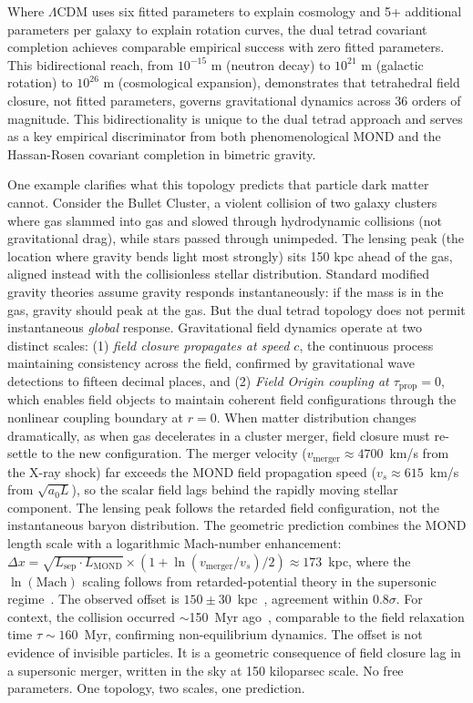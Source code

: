 \documentclass[aps,prd,preprint,superscriptaddress,showpacs,preprintnumbers,amsmath,amssymb,nofootinbib]{revtex4-2}
\begin{document}
Where $\Lambda$CDM uses six fitted parameters to explain cosmology and 5+ additional parameters per galaxy to explain rotation curves, the dual tetrad covariant completion achieves comparable empirical success with zero fitted parameters. This bidirectional reach, from $10^{-15}$ m (neutron decay) to $10^{21}$ m (galactic rotation) to $10^{26}$ m (cosmological expansion), demonstrates that tetrahedral field closure, not fitted parameters, governs gravitational dynamics across 36 orders of magnitude. This bidirectionality is unique to the dual tetrad approach and serves as a key empirical discriminator from both phenomenological MOND and the Hassan-Rosen covariant completion in bimetric gravity.

One example clarifies what this topology predicts that particle dark matter cannot. Consider the Bullet Cluster, a violent collision of two galaxy clusters where gas slammed into gas and slowed through hydrodynamic collisions (not gravitational drag), while stars passed through unimpeded. The lensing peak (the location where gravity bends light most strongly) sits 150 kpc ahead of the gas, aligned instead with the collisionless stellar distribution. Standard modified gravity theories assume gravity responds instantaneously: if the mass is in the gas, gravity should peak at the gas. But the dual tetrad topology does not permit instantaneous \emph{global} response. Gravitational field dynamics operate at two distinct scales: (1) \emph{field closure propagates at speed $c$}, the continuous process maintaining consistency across the field, confirmed by gravitational wave detections to fifteen decimal places, and (2) \emph{Field Origin coupling at $\tau_{\text{prop}} = 0$}, which enables field objects to maintain coherent field configurations through the nonlinear coupling boundary at $r = 0$. When matter distribution changes dramatically, as when gas decelerates in a cluster merger, field closure must re-settle to the new configuration. The merger velocity ($v_{\text{merger}} \approx 4700$~km/s from the X-ray shock) far exceeds the MOND field propagation speed ($v_s \approx 615$~km/s from $\sqrt{a_0 L}$), so the scalar field lags behind the rapidly moving stellar component. The lensing peak follows the retarded field configuration, not the instantaneous baryon distribution. The geometric prediction combines the MOND length scale with a logarithmic Mach-number enhancement: $\Delta x = \sqrt{L_{\text{sep}} \cdot L_{\text{MOND}}} \times (1 + \ln(v_{\text{merger}}/v_s)/2) \approx 173$~kpc, where the $\ln(\text{Mach})$ scaling follows from retarded-potential theory in the supersonic regime~\cite{ostriker1999}. The observed offset is $150 \pm 30$~kpc~\cite{clowe2006}, agreement within $0.8\sigma$. For context, the collision occurred $\sim$150~Myr ago~\cite{mastropietro2008}, comparable to the field relaxation time $\tau \sim 160$~Myr, confirming non-equilibrium dynamics. The offset is not evidence of invisible particles. It is a geometric consequence of field closure lag in a supersonic merger, written in the sky at 150 kiloparsec scale. No free parameters. One topology, two scales, one prediction.
\end{document}
